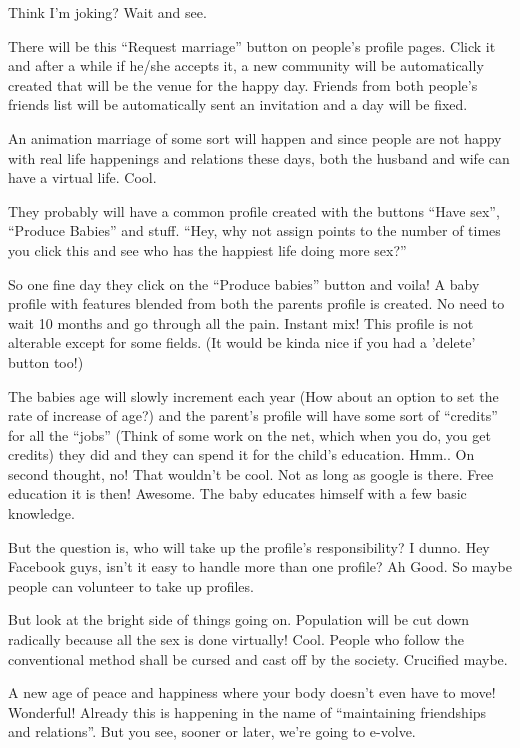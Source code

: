 \documentclass[twoside,11pt]{article}
\begin{document}
Think I'm joking? Wait and see.

There will be this ``Request marriage'' button on people's profile pages. Click it and after a while if he/she accepts it, a new community will be automatically created that will be the venue for the happy day. Friends from both people's friends list will be automatically sent an invitation and a day will be fixed.

An animation marriage of some sort will happen and since people are not happy with real life happenings and relations these days, both the husband and wife can have a virtual life. Cool.

They probably will have a common profile created with the buttons ``Have sex'', ``Produce Babies'' and stuff. ``Hey, why not assign points to the number of times you click this and see who has the happiest life doing more sex?''

So one fine day they click on the ``Produce babies'' button and voila! A baby profile with features blended from both the parents profile is created. No need to wait 10 months and go through all the pain. Instant mix! This profile is not alterable except for some fields. (It would be kinda nice if you had a 'delete' button too!)

The babies age will slowly increment each year (How about an option to set the rate of increase of age?) and the parent's profile will have some sort of ``credits'' for all the ``jobs'' (Think of some work on the net, which when you do, you get credits) they did and they can spend it for the child's education. Hmm.. On second thought, no! That wouldn't be cool. Not as long as google is there. Free education it is then! Awesome. The baby educates himself with a few basic knowledge.

But the question is, who will take up the profile's responsibility? I dunno. Hey Facebook guys, isn't it easy to handle more than one profile? Ah Good. So maybe people can volunteer to take up profiles.

But look at the bright side of things going on. Population will be cut down radically because all the sex is done virtually! Cool. People who follow the conventional method shall be cursed and cast off by the society. Crucified maybe.

A new age of peace and happiness where your body doesn't even have to move! Wonderful! Already this is happening in the name of ``maintaining friendships and relations''. But you see, sooner or later, we're going to e-volve.
\end{document}
